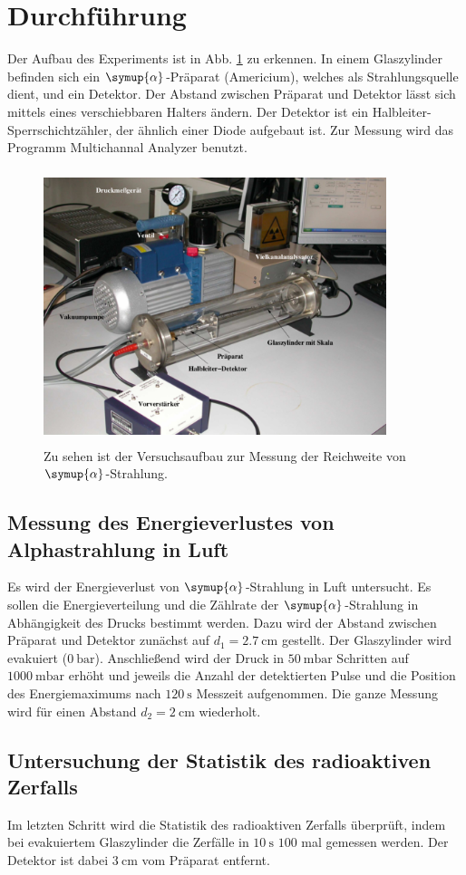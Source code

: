 \section{Durchführung}
\label{sec:Durchführung}

Der Aufbau des Experiments ist in Abb. \ref{fig:aufbau} zu erkennen. In einem Glaszylinder befinden sich ein $\symup{\alpha}$-Präparat (Americium), welches als Strahlungsquelle dient, und ein Detektor. Der Abstand zwischen Präparat und Detektor lässt sich mittels eines verschiebbaren Halters ändern. Der Detektor ist ein Halbleiter-Sperrschichtzähler, der ähnlich einer Diode aufgebaut ist. 
Zur Messung wird das Programm Multichannal Analyzer benutzt. 

\begin{figure}
    \centering
    \includegraphics[width=10cm, height=8cm]{build/aufbau.png}
    \caption{Zu sehen ist der Versuchsaufbau zur Messung der Reichweite von $\symup{\alpha}$-Strahlung. \cite{V701}}
    \label{fig:aufbau}
\end{figure}

\subsection{Messung des Energieverlustes von Alphastrahlung in Luft}
Es wird der Energieverlust von $\symup{\alpha}$-Strahlung in Luft untersucht.
Es sollen die Energieverteilung und die Zählrate der $\symup{\alpha}$-Strahlung in Abhängigkeit des Drucks bestimmt werden.
\newline
Dazu wird der Abstand zwischen Präparat und Detektor zunächst auf $d_1 = \SI{2.7}{\centi\meter}$ gestellt. Der Glaszylinder wird evakuiert ($\SI{0}{\bar}$). Anschließend wird der Druck in $\SI{50}{\milli\bar}$ Schritten auf $\SI{1000}{\milli\bar}$ erhöht und jeweils die Anzahl der detektierten Pulse und die Position des Energiemaximums nach $\SI{120}{\second}$ Messzeit aufgenommen.
\newline
Die ganze Messung wird für einen Abstand $d_2 = \SI{2}{\centi\meter}$ wiederholt.

\subsection{Untersuchung der Statistik des radioaktiven Zerfalls}
Im letzten Schritt wird die Statistik des radioaktiven Zerfalls überprüft, indem bei evakuiertem Glaszylinder die Zerfälle in $\SI{10}{\second}$ $\num{100}$ mal gemessen werden. Der Detektor ist dabei $\SI{3}{\centi\meter}$ vom Präparat entfernt.